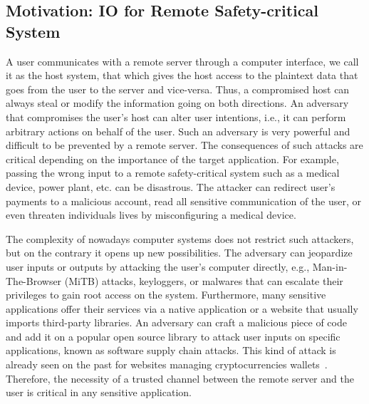 \subsection{Motivation: IO for Remote Safety-critical System}


A user communicates with a remote server through a computer interface, we call it as the host system, that which gives the host access to the plaintext data that goes from the user to the server and vice-versa. Thus, a compromised host can always steal or modify the information going on both directions. An adversary that compromises the user's host can alter user intentions, i.e., it can perform arbitrary actions on behalf of the user. Such an adversary is very powerful and difficult to be prevented by a remote server. The consequences of such attacks are critical depending on the importance of the target application. For example, passing the wrong input to a remote safety-critical system such as a medical device, power plant, etc. can be disastrous. The attacker can redirect user's payments to a malicious account, read all sensitive communication of the user, or even threaten individuals lives by misconfiguring a medical device. 


The complexity of nowadays computer systems does not restrict such attackers, but on the contrary it opens up new possibilities. The adversary can jeopardize user inputs or outputs by attacking the user's computer directly, e.g., Man-in-The-Browser (MiTB) attacks, keyloggers, or malwares that can escalate their privileges to gain root access on the system. Furthermore, many sensitive applications offer their services via a native application or a website that usually imports third-party libraries. An adversary can craft a malicious piece of code and add it on a popular open source library to attack user inputs on specific applications, known as software supply chain attacks. This kind of attack is already seen on the past for websites managing cryptocurrencies wallets~\cite{softSupplyChainAttack, jsSupplyChainAttack}. Therefore, the necessity of a trusted channel between the remote server and the user is critical in any sensitive application.



